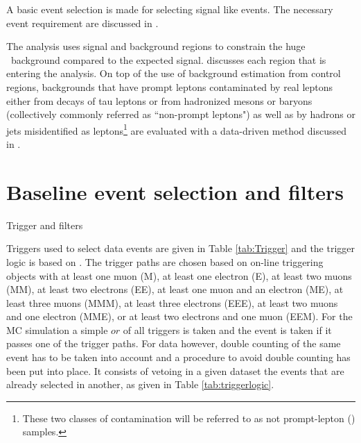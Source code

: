  A basic event selection is made for selecting signal like events. The necessary event requirement are discussed in . 

The analysis uses signal and background regions to constrain the huge \SM\ background compared to the expected signal.  discusses each region that is entering the analysis. On top of the use of background estimation from control regions, backgrounds that have  prompt leptons  contaminated by real leptons either
from decays of tau leptons or from hadronized mesons or baryons
(collectively commonly referred as ``non-prompt leptons") as well as by
hadrons or jets misidentified as leptons\footnote{These two classes
	of contamination will be referred to as not prompt-lepton (\NPL) samples.} are
evaluated with a data-driven method discussed in .
\section{Baseline event selection and filters}
Trigger and filters

Triggers used to select data events are given in Table \ref{tab:Trigger} and the trigger logic is based on \cite{CMSAN2016276}. The trigger paths are chosen based on on-line triggering objects with at least one muon (M), at least one electron (E), at least two muons (MM), at least two electrons (EE), at least one muon and an electron (ME), at least three muons (MMM), at least three electrons (EEE), at least two muons and one electron (MME), or at least two electrons and one muon (EEM). For the MC simulation a simple $or$ of all triggers is taken and the event is taken if it passes one of the trigger paths. For data however, double counting of the same event has to be taken into account and a procedure to avoid double counting has been put into place. It consists of vetoing in a given dataset the events that are already selected in another, as given in Table \ref{tab:triggerlogic}. 

